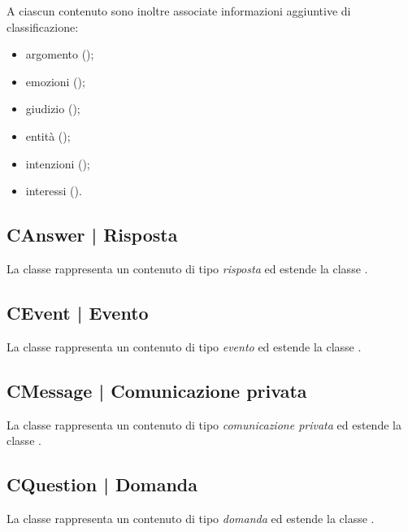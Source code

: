 \documentclass[10pt,a4paper,headinclude,footinclude,hidelinks]{scrreprt} %
\begin{document}
	A ciascun contenuto sono inoltre associate informazioni aggiuntive di classificazione:
	\begin{itemize}
	\item argomento (\textit{});
	\item emozioni (\textit{});
	\item giudizio (\textit{});
	\item entità (\textit{});
	\item intenzioni (\textit{});
	\item interessi (\textit{}).
	\end{itemize}

	\subsection[CAnswer]{CAnswer | Risposta}
	\label{sec:stage:design:sistema:model:answer}
	La classe rappresenta un contenuto di tipo \textit{risposta} ed estende la classe \textit{}.

	\subsection[CEvent]{CEvent | Evento}
	\label{sec:stage:design:sistema:model:event}
	La classe rappresenta un contenuto di tipo \textit{evento} ed estende la classe \textit{}.

	\subsection[CMessage]{CMessage | Comunicazione privata}
	\label{sec:stage:design:sistema:model:message}
	La classe rappresenta un contenuto di tipo \textit{comunicazione privata} ed estende la classe \textit{}.

	\subsection[CQuestion]{CQuestion | Domanda}
	\label{sec:stage:design:sistema:model:question}
	La classe rappresenta un contenuto di tipo \textit{domanda} ed estende la classe \textit{}.
\end{document}
